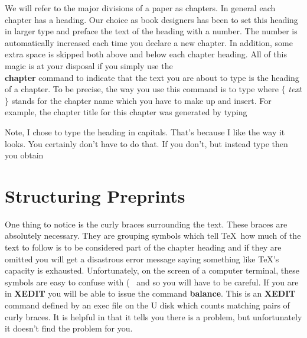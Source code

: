 We will refer to the major divisions of a paper as chapters.
In general each chapter has a heading.
Our choice as book designers has been to set this heading in
larger type and preface the text of the heading with a number.
The number is automatically increased each time you declare a
new chapter.
In addition, some extra space is skipped both above and below
each chapter heading.
All of this magic is at your disposal if you simply use the
{\bf \\chapter} command to indicate that the text you are
about to type is the heading of a chapter.
\storechap \storesec
To be precise, the way you use this command is to type
where $\{$ {\it text} $\}$ stands
for the chapter name which you have to make
up and insert.
For example, the chapter title for this chapter was generated by
typing
 
Note, I chose to type the heading in capitals.
That's because I like the way it looks.
You certainly don't have to do that.
If you don't, but instead type
then you obtain \recallchap
\chapter{Structuring Preprints}
 
One thing to notice is the curly braces surrounding the text.
These braces are absolutely necessary.
They are grouping symbols which tell \TeX\ how much of the
text to follow is to be considered part of the chapter heading
and if they are omitted you will get a disastrous error message
saying something like \TeX 's capacity is exhausted.
Unfortunately, on the screen of a computer terminal,
these symbols are easy to confuse with ( \
and so you will have to be careful.
If you are in {\bf XEDIT}
you will be able to issue the command {\bf balance}.
This is an {\bf XEDIT} command defined by an exec file on the U
disk which counts matching pairs of curly braces.
It is helpful in that it tells you there is a problem, but
unfortunately it doesn't find the problem for you.
 
